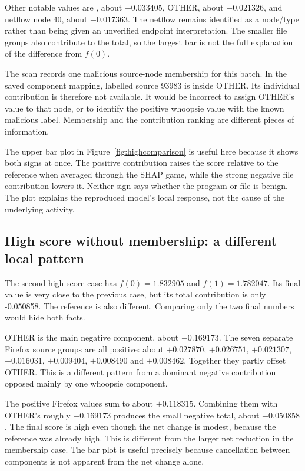 \documentclass[11pt,a4paper]{article}
\newcommand{\HighNoMemberReference}{1.832905}
\newcommand{\HighNoMemberOriginal}{1.782047}
\newcommand{\HighNoMemberSum}{-0.050858}
\begin{document}
Other notable values are , about $-0.033405$,
OTHER, about $-0.021326$, and netflow node 40, about $-0.017363$. The netflow
remains identified as a node/type rather than being given an unverified endpoint
interpretation. The smaller file groups also contribute to the total, so the
largest bar is not the full explanation of the difference from $f(0)$.

The scan records one malicious source-node membership for this batch. In the
saved component mapping, labelled source 93983 is inside OTHER. Its individual
contribution is therefore not available. It would be incorrect to assign
OTHER's value to that node, or to identify the positive whoopsie value with the
known malicious label. Membership and the contribution ranking are different
pieces of information.

The upper bar plot in Figure~\ref{fig:highcomparison} is useful here because it
shows both signs at once. The positive contribution raises the score relative
to the reference when averaged through the SHAP game, while the strong negative
file contribution lowers it. Neither sign says whether the program or file is
benign. The plot explains the reproduced model's local response, not the cause
of the underlying activity.

\subsection{High score without membership: a different local pattern}
The second high-score case has $f(0)=\HighNoMemberReference$ and
$f(1)=\HighNoMemberOriginal$. Its final value is very close to the previous
case, but its total contribution is only \HighNoMemberSum{}. The reference is
also different. Comparing only the two final numbers would hide both facts.

OTHER is the main negative component, about $-0.169173$. The seven separate
Firefox source groups are all positive: about $+0.027870$, $+0.026751$,
$+0.021307$, $+0.016031$, $+0.009404$, $+0.008490$ and $+0.008462$. Together they
partly offset OTHER. This is a different pattern from a dominant negative
 contribution opposed mainly by one whoopsie component.

The positive Firefox values sum to about $+0.118315$. Combining them with
OTHER's roughly $-0.169173$ produces the small negative total, about $-0.050858$.
The final score is high even though the net change is modest, because the
reference was already high. This is different from the larger net reduction
in the membership case. The bar plot is useful precisely because cancellation
between components is not apparent from the net change alone.
\end{document}
